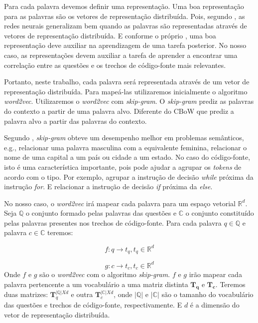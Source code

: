 Para cada palavra devemos definir uma representação. Uma boa representação para as palavras são os vetores de representação distribuída. Pois, segundo \cite{Goodfellow-et-al-2016:representation-learning}, as redes neurais generalizam bem quando as palavras são representadas através de vetores de representação distribuída. E conforme o próprio \citeauthor{Goodfellow-et-al-2016:representation-learning}, uma boa representação deve auxiliar na aprendizagem de uma tarefa posterior. No nosso caso, as representações devem auxiliar a tarefa de aprender a encontrar uma correlação entre as questões e os trechos de código-fonte mais relevantes.

Portanto, neste trabalho, cada palavra será representada através de um vetor de representação distribuída. Para mapeá-las utilizaremos inicialmente o algoritmo \textit{word2vec}. Utilizaremos o \textit{word2vec} com \textit{skip-gram}. O \textit{skip-gram} prediz as palavras do contexto a partir de uma palavra alvo. Diferente do CBoW que prediz a palavra alvo a partir das palavras do contexto. 

Segundo \cite{mikolov2013distributed}, \textit{skip-gram} obteve um desempenho melhor em problemas semânticos, e.g., relacionar uma palavra masculina com a equivalente feminina, relacionar o nome de uma capital a um país ou cidade a um estado. No caso do código-fonte, isto é uma característica importante, pois pode ajudar a agrupar os \textit{tokens} de acordo com o tipo. Por exemplo, agrupar a instrução de decisão \textit{while} próxima da instrução \textit{for}. E relacionar a instrução de decisão \textit{if} próxima da \textit{else}.

No nosso caso, o \textit{word2vec} irá mapear cada palavra para um espaço vetorial $\mathbb{R}^{d}$. Seja $\mathbb{Q}$ o conjunto formado pelas palavras das questões e $\mathbb{C}$ o conjunto constituído pelas palavras presentes nos trechos de código-fonte. Para cada palavra ${q} \in \mathbb{Q}$ e palavra ${c} \in \mathbb{C}$ teremos:

\begin{equation}
    f: {q} \rightarrow t_{q}, t_{q} \in \mathbb{R}^{d}
\end{equation}

\begin{equation}
    g: {c} \rightarrow t_{c}, t_{c} \in \mathbb{R}^{d}
\end{equation}
Onde $f$ e $g$ são o \textit{word2vec} com o algoritmo \textit{skip-gram}. $f$ e $g$ irão mapear cada palavra pertencente a um vocabulário a uma matriz distinta $\bm{T_{q}}$ e $\bm{T_{c}}$.
Teremos duas matrizes: $\bm{T}_{q}^{|\mathbb{Q}| X d}$ e outra $\bm{T}_{c}^{|\mathbb{C}| X d}$, onde $|\mathbb{Q}|$ e $|\mathbb{C}|$ são o tamanho do vocabulário das questões e trechos de código-fonte, respectivamente. E $d$ é a dimensão do vetor de representação distribuída.

